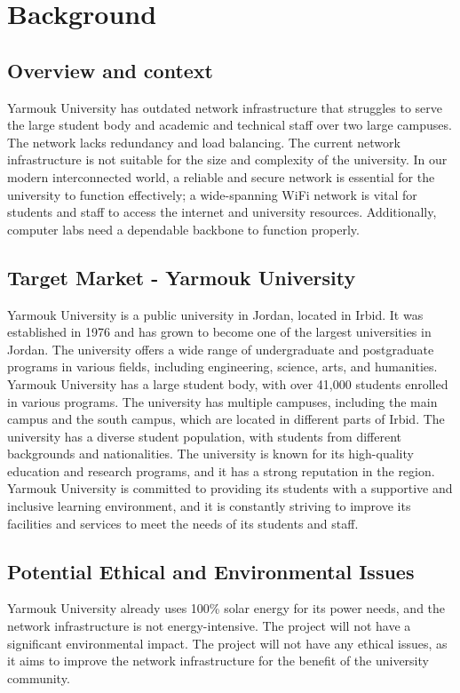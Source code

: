 \documentclass[12pt]{report}
\begin{document}

\chapter{Background}
\section{Overview and context}
Yarmouk University has outdated network infrastructure that struggles to serve the large student body and academic and technical staff over two large campuses. The network lacks redundancy and load balancing. The current network infrastructure is not suitable for the size and complexity of the university. In our modern interconnected world, a reliable and secure network is essential for the university to function effectively; a wide-spanning WiFi network is vital for students and staff to access the internet and university resources. Additionally, computer labs need a dependable backbone to function properly.
\section{Target Market - Yarmouk University}
Yarmouk University is a public university in Jordan, located in Irbid. It was established in 1976 and has grown to become one of the largest universities in Jordan. The university offers a wide range of undergraduate and postgraduate programs in various fields, including engineering, science, arts, and humanities. Yarmouk University has a large student body, with over 41,000 students enrolled in various programs. The university has multiple campuses, including the main campus and the south campus, which are located in different parts of Irbid. The university has a diverse student population, with students from different backgrounds and nationalities. The university is known for its high-quality education and research programs, and it has a strong reputation in the region. Yarmouk University is committed to providing its students with a supportive and inclusive learning environment, and it is constantly striving to improve its facilities and services to meet the needs of its students and staff.\cite{YU}

\section{Potential Ethical and Environmental Issues}
Yarmouk University already uses 100\% solar energy for its power needs, and the network infrastructure is not energy-intensive. The project will not have a significant environmental impact. The project will not have any ethical issues, as it aims to improve the network infrastructure for the benefit of the university community.
\end{document}
